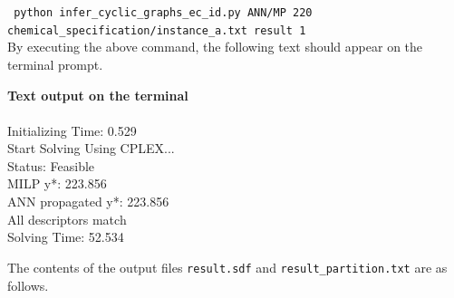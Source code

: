 \documentclass[11pt, titlepage, dvipdfmx, twoside]{article}
\begin{document}
{\tt 
 python infer\_cyclic\_graphs\_ec\_id.py 
ANN/MP
220 \\
 \phantom{python } 
chemical\_specification/instance\_a.txt
result
1
 }\\


By executing the above command, the following text should appear on the terminal prompt.

\bigskip

\begin{oframed}
{\bf Text output on the terminal}\\\\
 Initializing Time: 0.529  \\
Start Solving Using CPLEX...\\
Status: Feasible 		\\
MILP y*: 223.856 		\\
ANN propagated y*: 223.856 \\
All descriptors match    	\\
Solving Time: 52.534       
\end{oframed}

The contents of the output files {\tt result.sdf} and
{\tt result\_partition.txt} are as follows.

\bigskip
\end{document}
